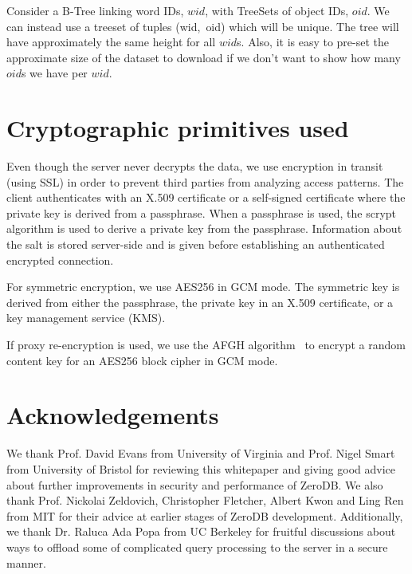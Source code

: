 \documentclass[notitlepage,longbibliography]{revtex4-1}
\begin{document}
Consider a B-Tree linking word IDs, $wid$, with TreeSets of object IDs, $oid$.
We can instead use a treeset of tuples (wid,~oid) which will be unique.
The tree will have approximately the same height for all $wid$s.
Also, it is easy to pre-set the approximate size of the dataset to download if we don't want to show how many $oid$s we have per $wid$.

\section{Cryptographic primitives used}

Even though the server never decrypts the data, we use encryption in transit (using SSL) in order to prevent third parties from analyzing access patterns.
The client authenticates with an X.509 certificate or a self-signed certificate where the private key is derived from a passphrase.
When a passphrase is used, the scrypt algorithm is used to derive a private key from the passphrase. Information about the salt is stored server-side and is given before establishing an authenticated encrypted connection.

For symmetric encryption, we use AES256 in GCM mode.
The symmetric key is derived from either the passphrase, the private key in an X.509 certificate, or a key management service (KMS).

If proxy re-encryption is used, we use the AFGH algorithm~\cite{afgh} to encrypt a random content key for an AES256 block cipher in GCM mode.

\section{Acknowledgements}

We thank Prof. David Evans from University of Virginia and Prof. Nigel Smart from University of Bristol for reviewing this whitepaper
and giving good advice about further improvements in security and performance of ZeroDB.
We also thank Prof. Nickolai Zeldovich, Christopher Fletcher, Albert Kwon and Ling Ren from MIT for their advice at earlier stages of ZeroDB development.
Additionally, we thank Dr. Raluca Ada Popa from UC Berkeley for fruitful discussions about ways to offload some of complicated query processing to the server
in a secure manner.


\end{document}
